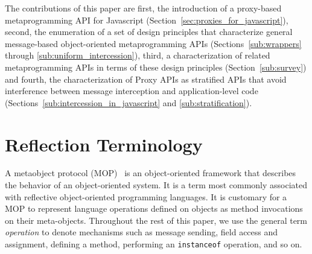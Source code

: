 \documentclass{sig-alternate}
\begin{document}
The contributions of this paper are first, the introduction of a proxy-based metaprogramming API for Javascript (Section~\ref{sec:proxies_for_javascript}), second, the enumeration of a set of design principles that characterize general message-based object-oriented metaprogramming APIs (Sections~\ref{sub:wrappers} through \ref{sub:uniform_intercession}), third, a characterization of related metaprogramming APIs in terms of these design principles (Section~\ref{sub:survey}) and fourth, the characterization of Proxy APIs as stratified APIs that avoid interference between message interception and application-level code (Sections~\ref{sub:intercession_in_javascript} and \ref{sub:stratification}).



\section{Reflection Terminology}
\label{sec:reflection}



A metaobject protocol (MOP)~\cite{kiczales91art} is an object-oriented framework that describes the behavior of an object-oriented system. It is a term most commonly associated with reflective object-oriented programming languages. It is customary for a MOP to represent language operations defined on objects as method invocations on their meta-objects. Throughout the rest of this paper, we use the general term \emph{operation} to denote mechanisms such as message sending, field access and assignment, defining a method, performing an \texttt{instanceof} operation, and so on.
\end{document}
